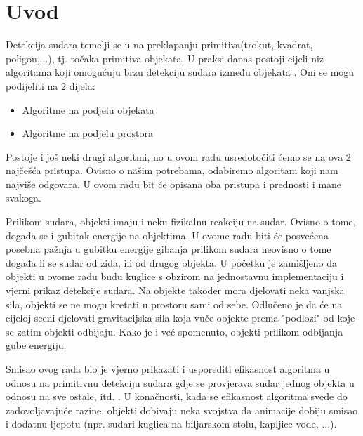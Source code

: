 \chapter{Uvod}

Detekcija sudara temelji se u na preklapanju primitiva(trokut, kvadrat, poligon,...)\cite{1}, tj. točaka primitiva objekata. U praksi danas postoji cijeli niz algoritama koji omogućuju brzu detekciju sudara između objekata \cite{1}. Oni se mogu podijeliti na 2 dijela:
\begin{itemize}
	\item Algoritme na podjelu objekata
	\item Algoritme na podjelu prostora
\end{itemize}
Postoje i još neki drugi algoritmi, no u ovom radu usredotočiti ćemo se na ova 2 najčešća pristupa. Ovisno o našim potrebama, odabiremo algoritam koji nam najviše odgovara. U ovom radu bit će opisana oba pristupa i prednosti i mane svakoga.

Prilikom sudara, objekti imaju i neku fizikalnu reakciju na sudar. Ovisno o tome, događa se i gubitak energije na objektima. U ovome radu biti će posvećena posebna pažnja u gubitku energije gibanja prilikom sudara neovisno o tome događa li se sudar od zida, ili od drugog objekta. U početku je zamišljeno da objekti u ovome radu budu kuglice s obzirom na jednostavnu implementaciju i vjerni prikaz detekcije sudara. Na objekte također mora djelovati neka vanjska sila, objekti se ne mogu kretati u prostoru sami od sebe. Odlučeno je da će na cijeloj sceni djelovati gravitacijska sila koja vuče objekte prema "podlozi" od koje se zatim objekti odbijaju. Kako je i već spomenuto, objekti prilikom odbijanja gube energiju.

Smisao ovog rada bio je vjerno prikazati i usporediti efikasnost algoritma u odnosu na primitivnu detekciju sudara gdje se provjerava sudar jednog objekta u odnosu na sve ostale, itd. . U konačnosti, kada se efikasnost algoritma svede do zadovoljavajuće razine, objekti dobivaju neka svojstva da animacije dobiju smisao i dodatnu ljepotu (npr. sudari kuglica na biljarskom stolu, kapljice vode, ...).


